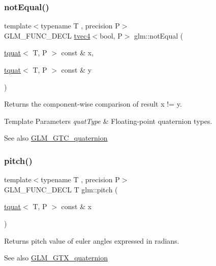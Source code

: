 \subsubsection{\texorpdfstring{not\+Equal()}{notEqual()}}
{\footnotesize\ttfamily template$<$typename T , precision P$>$ \\
G\+L\+M\+\_\+\+F\+U\+N\+C\+\_\+\+D\+E\+CL \hyperlink{structglm_1_1tvec4}{tvec4}$<$bool, P$>$ glm\+::not\+Equal (\begin{DoxyParamCaption}\item[{\hyperlink{structglm_1_1tquat}{tquat}$<$ T, P $>$ const \&}]{x,  }\item[{\hyperlink{structglm_1_1tquat}{tquat}$<$ T, P $>$ const \&}]{y }\end{DoxyParamCaption})}

Returns the component-\/wise comparison of result x != y.


\begin{DoxyTemplParams}{Template Parameters}
{\em quat\+Type} & Floating-\/point quaternion types.\\
\hline
\end{DoxyTemplParams}
\begin{DoxySeeAlso}{See also}
\hyperlink{group__gtc__quaternion}{G\+L\+M\+\_\+\+G\+T\+C\+\_\+quaternion} 
\end{DoxySeeAlso}
\mbox{\label{group__gtc__quaternion_ga2c08b93a4261c10748fd4d2104346f17}} 
\subsubsection{\texorpdfstring{pitch()}{pitch()}}
{\footnotesize\ttfamily template$<$typename T , precision P$>$ \\
G\+L\+M\+\_\+\+F\+U\+N\+C\+\_\+\+D\+E\+CL T glm\+::pitch (\begin{DoxyParamCaption}\item[{\hyperlink{structglm_1_1tquat}{tquat}$<$ T, P $>$ const \&}]{x }\end{DoxyParamCaption})}

Returns pitch value of euler angles expressed in radians.

\begin{DoxySeeAlso}{See also}
\hyperlink{group__gtx__quaternion}{G\+L\+M\+\_\+\+G\+T\+X\+\_\+quaternion} 
\end{DoxySeeAlso}
\mbox{\label{group__gtc__quaternion_ga950f8acff3e33bbda77895a3dcb7e5ce}} 
